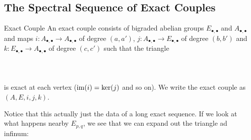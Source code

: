 \documentclass[a4paper]{article}
\begin{document}
\subsection{The Spectral Sequence of Exact Couples}
\begin{defn}{Exact Couple}{} An exact couple consists of bigraded abelian groups $E_{\bullet,\bullet}$ and $A_{\bullet,\bullet}$ and maps $i:A_{\bullet,\bullet}\to A_{\bullet,\bullet}$ of degree $(a,a')$, $j:A_{\bullet,\bullet}\to E_{\bullet,\bullet}$ of degree $(b,b')$ and $k:E_{\bullet,\bullet}\to A_{\bullet,\bullet}$ of degree $(c,c')$ such that the triangle \\~\\
\\~\\
is exact at each vertex ($\operatorname{im}(i)=\ker(j)$ and so on). We write the exact couple as $(A,E,i,j,k)$. 
\end{defn}

Notice that this actually just the data of a long exact sequence. If we look at what happens nearby $E_{p,q}$, we see that we can expand out the triangle ad infinum: \\~\\
\\~\\
\end{document}
